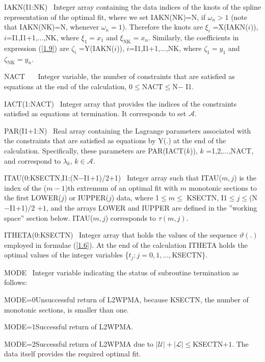 \documentclass[acmtoms]{acmtrans2m}
\begin{document}
IAKN(I1:NK) \ Integer array containing the data indices of the knots of the
spline representation of the optimal fit, where we set IAKN(NK)=N, if $%
\omega _{\kappa }>1$ (note that IAKN(NK)=N, whenever $\omega _{\kappa }=1$).
Therefore the knots are $\xi _{i}$ =X(IAKN($i$)), $i$=I1,I1+1,...,NK, where $%
\xi _{1}=x_{1}$ and $\xi _{\text{NK}}=x_{n}$. Similarly, the coefficients in
expression (\ref{1.9}) are $\zeta _{i}$ =Y(IAKN($i$)), $i$=I1,I1+1,...,NK,
where $\zeta _{1}=y_{1}$ and $\zeta _{\text{NK}}=y_{n}$.

NACT \qquad\ \ \ Integer variable, the number of constraints that are
satisfied as equations at the end of the calculation, 0$\leq $NACT$\leq $N$-$%
I1.

IACT(1:NACT) \ Integer array that provides the indices of the constraints
satisfied as equations at termination. It corresponds to set $\mathscr{A}$.

PAR(I1+1:N) \ Real array containing the Lagrange parameters associated with
the constraints that are satisfied as equations by Y(.) at the end of the
calculation. Specifically, these parameters are PAR(IACT($k$)), $k$%
=1,2,...,NACT, and correspond to $\lambda _{k}$, $k\in \mathscr{A}$.

ITAU(0:KSECTN,I1:(N$-$I1+1)/2+1) \ Integer array such that ITAU($m,j$) is
the index of the ($m-1$)th extremum of an optimal fit with $m$ monotonic
sections to the first LOWER($j$) or IUPPER($j$) data, where 1$\leq m\leq $%
KSECTN, I1$\leq j\leq $(N$-$I1+1)$/2$ $+1$, and the arrays LOWER and IUPPER
are defined in the ''working space'' section below. ITAU($m,j$) corresponds
to $\tau (m,j)$.

ITHETA(0:KSECTN) \ Integer array that holds the values of the sequence $%
\vartheta (.)$ employed in formulae (\ref{1.6}). At the end of the
calculation ITHETA holds the optimal values of the integer variables \{$%
t_{j}:j=0,1,\ldots ,$KSECTN\}.

MODE \ \qquad Integer variable indicating the status of subroutine
termination as follows:

\qquad MODE=0\qquad Unsuccessful return of L2WPMA, because KSECTN, the
number of monotonic sections, is smaller than one.

\qquad MODE=1\qquad Successful return of L2WPMA.

\qquad MODE=2\qquad Successful return of L2WPMA due to $|\mathscr{U}|+|%
\mathscr{L}|\leq $KSECTN$+1$. The data itself provides the required optimal
fit.

\bigskip
\end{document}
